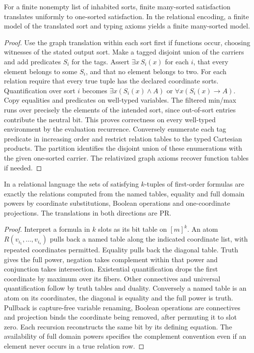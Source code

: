 \begin{proposition}
For a finite nonempty list of inhabited sorts, finite many-sorted satisfaction translates uniformly to one-sorted satisfaction. In the relational encoding, a finite model of the translated sort and typing axioms yields a finite many-sorted model.
\end{proposition}
\begin{proof}
Use the graph translation within each sort first if functions occur, choosing witnesses of the stated output sort. Make a tagged disjoint union of the carriers and add predicates $S_i$ for the tags. Assert $\exists x\,S_i(x)$ for each $i$, that every element belongs to some $S_i$, and that no element belongs to two. For each relation require that every true tuple has the declared coordinate sorts. Quantification over sort $i$ becomes $\exists x(S_i(x)\land A)$ or $\forall x(S_i(x)\to A)$. Copy equalities and predicates on well-typed variables. The filtered min/max runs over precisely the elements of the intended sort, since out-of-sort entries contribute the neutral bit. This proves correctness on every well-typed environment by the evaluation recurrence. Conversely enumerate each tag predicate in increasing order and restrict relation tables to the typed Cartesian products. The partition identifies the disjoint union of these enumerations with the given one-sorted carrier. The relativized graph axioms recover function tables if needed.
\end{proof}

\begin{proposition}
In a relational language the sets of satisfying $k$-tuples of first-order formulas are exactly the relations computed from the named tables, equality and full domain powers by coordinate substitutions, Boolean operations and one-coordinate projections. The translations in both directions are PR.
\end{proposition}
\begin{proof}
Interpret a formula in $k$ slots as its bit table on $[m]^k$. An atom $R(v_{i_1},\ldots,v_{i_s})$ pulls back a named table along the indicated coordinate list, with repeated coordinates permitted. Equality pulls back the diagonal table. Truth gives the full power, negation takes complement within that power and conjunction takes intersection. Existential quantification drops the first coordinate by maximum over its fibers. Other connectives and universal quantification follow by truth tables and duality. Conversely a named table is an atom on its coordinates, the diagonal is equality and the full power is truth. Pullback is capture-free variable renaming, Boolean operations are connectives and projection binds the coordinate being removed, after permuting it to slot zero. Each recursion reconstructs the same bit by its defining equation. The availability of full domain powers specifies the complement convention even if an element never occurs in a true relation row.
\end{proof}

